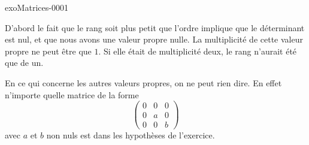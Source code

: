 
\begin{corrige}{exoMatrices-0001}

	D'abord le fait que le rang soit plus petit que l'ordre implique que le déterminant est nul, et que nous avons une valeur propre nulle. La multiplicité de cette valeur propre ne peut être que $1$. Si elle était de multiplicité deux, le rang n'aurait été que de un.

	En ce qui concerne les autres valeurs propres, on ne peut rien dire. En effet n'importe quelle matrice de la forme
	\begin{equation}
		\begin{pmatrix}
			0	&	0	&	0	\\
			0	&	a	&	0	\\
			0	&	0	&	b
		\end{pmatrix}
	\end{equation}
	avec $a$ et $b$ non nuls est dans les hypothèses de l'exercice.

\end{corrige}
